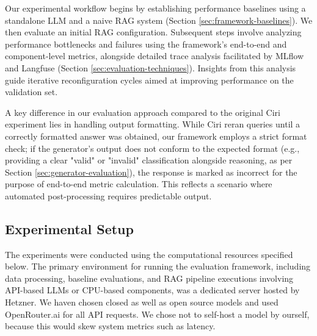 Our experimental workflow begins by establishing performance baselines using a standalone LLM and a naive RAG system (Section \ref{sec:framework-baselines}). We then evaluate an initial RAG configuration. Subsequent steps involve analyzing performance bottlenecks and failures using the framework's end-to-end and component-level metrics, alongside detailed trace analysis facilitated by MLflow and Langfuse (Section \ref{sec:evaluation-techniques}). Insights from this analysis guide iterative reconfiguration cycles aimed at improving performance on the validation set.

A key difference in our evaluation approach compared to the original Ciri experiment \cite{Lian.2024} lies in handling output formatting. While Ciri reran queries until a correctly formatted answer was obtained, our framework employs a strict format check; if the generator's output does not conform to the expected format (e.g., providing a clear "valid" or "invalid" classification alongside reasoning, as per Section \ref{sec:generator-evaluation}), the response is marked as incorrect for the purpose of end-to-end metric calculation. This reflects a scenario where automated post-processing requires predictable output.





\subsection{Experimental Setup} \label{sec:exp_setup}
The experiments were conducted using the computational resources specified below. The primary environment for running the evaluation framework, including data processing, baseline evaluations, and RAG pipeline executions involving API-based LLMs or CPU-based components, was a dedicated server hosted by Hetzner. We haven chosen closed as well as open source models and used \\OpenRouter.ai\cite{openrouter-inc-2023} for all API requests. We chose not to self-host a model by ourself, because this would skew system metrics such as latency.

